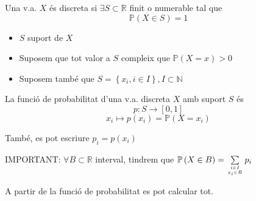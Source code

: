 \documentclass[../main.tex]{subfiles}
\begin{document}
    \begin{definicio}
        Una v.a. $X$ és discreta si $\exists S \subset \mathbb{R}$ finit o numerable tal que 
        \begin{displaymath}
            \mathbb{P}\left(X \in S\right) = 1
        \end{displaymath}
        \begin{itemize}
            \item $S$ suport de $X$
            \item Suposem que tot valor a $S$ compleix que $\mathbb{P}\left(X = x\right) > 0$
            \item Suposem també que $S = \left\{x_i, i\in I\right\}, I \subset \mathbb{N}$ 
        \end{itemize}
        \begin{definicio}
            La funció de probabilitat d'una v.a. discreta $X$ amb suport $S$ és
            \begin{displaymath}
                p: S \to \left[0, 1\right]
            \end{displaymath}
            \begin{displaymath}
                x_i \longmapsto p\left(x_i\right)  = \mathbb{P} \left(X = x_i\right)  
            \end{displaymath}
        \end{definicio}
    \end{definicio}
    \begin{notacio}
        També, es pot escriure $p_i = p\left(x_i\right)$
    \end{notacio}
    \begin{obs}
        IMPORTANT: $\forall B \subset \mathbb{R}$ interval, tindrem que $\mathbb{P}\left(X \in B\right) = \sum\limits_{i \in I\atop x_i \in B} p_i$
    \end{obs}
    \begin{obs}
        A partir de la funció de probabilitat es pot calcular tot.
    \end{obs}
\end{document}
